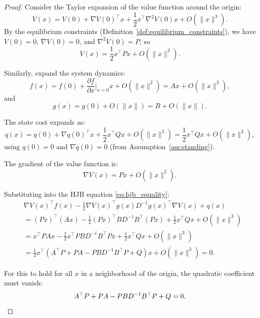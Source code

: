 \documentclass[11pt]{article}
\begin{document}
\begin{proof}
Consider the Taylor expansion of the value function around the origin:
\[
V(x) = V(0) + \nabla V(0)^\top x + \frac{1}{2}x^\top \nabla^2 V(0) x + O(\|x\|^3).
\]
By the equilibrium constraints (Definition~\ref{def:equilibrium_constraints}), we have $V(0) = 0$, $\nabla V(0) = 0$, and $\nabla^2 V(0) = P$, so
\[
V(x) = \frac{1}{2}x^\top P x + O(\|x\|^3).
\]

Similarly, expand the system dynamics:
\[
f(x) = f(0) + \frac{\partial f}{\partial x}\bigg|_{x=0} x + O(\|x\|^2) = Ax + O(\|x\|^2),
\]
and
\[
g(x) = g(0) + O(\|x\|) = B + O(\|x\|).
\]

The state cost expands as:
\[
q(x) = q(0) + \nabla q(0)^\top x + \frac{1}{2}x^\top Q x + O(\|x\|^3) = \frac{1}{2}x^\top Q x + O(\|x\|^3),
\]
using $q(0) = 0$ and $\nabla q(0) = 0$ (from Assumption~\ref{ass:standing}).

The gradient of the value function is:
\[
\nabla V(x) = Px + O(\|x\|^2).
\]

Substituting into the HJB equation \eqref{eq:hjb_equality}:
\begin{align*}
&\nabla V(x)^\top f(x) - \frac{1}{2}\nabla V(x)^\top g(x)D^{-1}g(x)^\top \nabla V(x) + q(x) \\
&= (Px)^\top (Ax) - \frac{1}{2}(Px)^\top B D^{-1} B^\top (Px) + \frac{1}{2}x^\top Q x + O(\|x\|^3) \\
&= x^\top PAx - \frac{1}{2}x^\top PB D^{-1} B^\top P x + \frac{1}{2}x^\top Q x + O(\|x\|^3) \\
&= \frac{1}{2}x^\top \left( A^\top P + PA - PBD^{-1}B^\top P + Q \right) x + O(\|x\|^3) = 0.
\end{align*}

For this to hold for all $x$ in a neighborhood of the origin, the quadratic coefficient must vanish:
\[
A^\top P + PA - PBD^{-1}B^\top P + Q = 0. \qedhere
\]
\end{proof}
\end{document}
